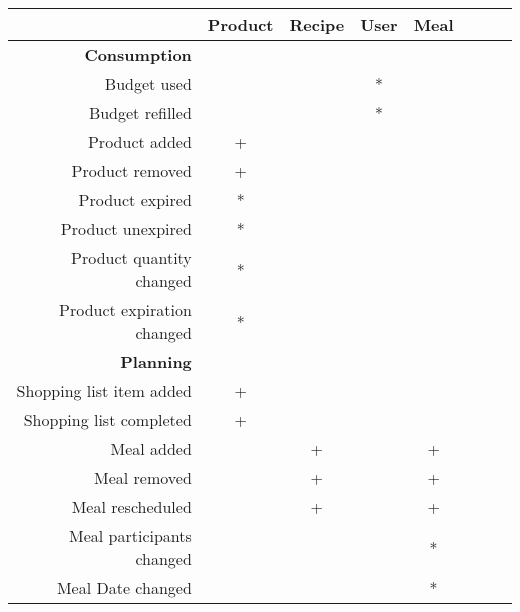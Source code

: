 \begin{table}
    \begin{tabular}{|r|c|c|c|c|c|c|}
        \hline
        ~                                      & Product & Recipe & User & Meal & ~ & ~ \\ \hline
        \textbf{Consumption}                   & ~       & ~      & ~    & ~    & ~ & ~ \\ 
        Budget used                            & ~       & ~      & *    & ~    & ~ & ~ \\ 
        Budget refilled                        & ~       & ~      & *    & ~    & ~ & ~ \\ 
        Product added                          & +       & ~      & ~    & ~    & ~ & ~ \\ 
        Product removed                        & +       & ~      & ~    & ~    & ~ & ~ \\ 
        Product expired                        & *       & ~      & ~    & ~    & ~ & ~ \\ 
        Product unexpired                      & *       & ~      & ~    & ~    & ~ & ~ \\ 
        Product quantity changed               & *       & ~      & ~    & ~    & ~ & ~ \\ 
        Product expiration changed             & *       & ~      & ~    & ~    & ~ & ~ \\ 
        \textbf{Planning}                      & ~       & ~      & ~    & ~    & ~ & ~ \\ 
        Shopping list item added               & +       & ~      & ~    & ~    & ~ & ~ \\ 
        Shopping list completed                & +       & ~      & ~    & ~    & ~ & ~ \\ 
        Meal added                             & ~       & +      & ~    & +    & ~ & ~ \\ 
        Meal removed                           & ~       & +      & ~    & +    & ~ & ~ \\ 
        Meal rescheduled                       & ~       & +      & ~    & +    & ~ & ~ \\ 
        Meal participants changed              & ~       & ~      & ~    & *    & ~ & ~ \\ 
        Meal Date changed                      & ~       & ~      & ~    & *    & ~ & ~ \\ 

\end{tabular}
\end{table}
